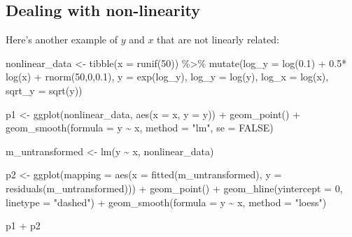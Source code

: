 \documentclass[
  letterpaper,
  8pt,
  a4paper]{book}
\newenvironment{Shaded}{\begin{snugshade}}{\end{snugshade}}
\newcommand{\AttributeTok}[1]{\textcolor[rgb]{0.40,0.45,0.13}{#1}}
\newcommand{\ConstantTok}[1]{\textcolor[rgb]{0.56,0.35,0.01}{#1}}
\newcommand{\DecValTok}[1]{\textcolor[rgb]{0.68,0.00,0.00}{#1}}
\newcommand{\FloatTok}[1]{\textcolor[rgb]{0.68,0.00,0.00}{#1}}
\newcommand{\FunctionTok}[1]{\textcolor[rgb]{0.28,0.35,0.67}{#1}}
\newcommand{\NormalTok}[1]{\textcolor[rgb]{0.00,0.23,0.31}{#1}}
\newcommand{\OtherTok}[1]{\textcolor[rgb]{0.00,0.23,0.31}{#1}}
\newcommand{\SpecialCharTok}[1]{\textcolor[rgb]{0.37,0.37,0.37}{#1}}
\newcommand{\StringTok}[1]{\textcolor[rgb]{0.13,0.47,0.30}{#1}}
\begin{document}
\subsection*{Dealing with
non-linearity}\label{dealing-with-non-linearity}

Here's another example of \(y\) and \(x\) that are not linearly related:

\begin{Shaded}
\begin{Highlighting}[]
\NormalTok{nonlinear\_data }\OtherTok{\textless{}{-}} \FunctionTok{tibble}\NormalTok{(}\AttributeTok{x =} \FunctionTok{runif}\NormalTok{(}\DecValTok{50}\NormalTok{)) }\SpecialCharTok{\%\textgreater{}\%}
  \FunctionTok{mutate}\NormalTok{(}\AttributeTok{log\_y =} \FunctionTok{log}\NormalTok{(}\FloatTok{0.1}\NormalTok{) }\SpecialCharTok{+} \FloatTok{0.5}\SpecialCharTok{*} \FunctionTok{log}\NormalTok{(x) }\SpecialCharTok{+} \FunctionTok{rnorm}\NormalTok{(}\DecValTok{50}\NormalTok{,}\DecValTok{0}\NormalTok{,}\FloatTok{0.1}\NormalTok{),}
         \AttributeTok{y =} \FunctionTok{exp}\NormalTok{(log\_y),}
         \AttributeTok{log\_y =} \FunctionTok{log}\NormalTok{(y),}
         \AttributeTok{log\_x =} \FunctionTok{log}\NormalTok{(x),}
         \AttributeTok{sqrt\_y =} \FunctionTok{sqrt}\NormalTok{(y))}

\NormalTok{p1 }\OtherTok{\textless{}{-}} \FunctionTok{ggplot}\NormalTok{(nonlinear\_data, }\FunctionTok{aes}\NormalTok{(}\AttributeTok{x =}\NormalTok{ x, }\AttributeTok{y =}\NormalTok{ y)) }\SpecialCharTok{+}
  \FunctionTok{geom\_point}\NormalTok{() }\SpecialCharTok{+} 
  \FunctionTok{geom\_smooth}\NormalTok{(}\AttributeTok{formula =}\NormalTok{ y }\SpecialCharTok{\textasciitilde{}}\NormalTok{ x, }\AttributeTok{method =} \StringTok{"lm"}\NormalTok{, }\AttributeTok{se =} \ConstantTok{FALSE}\NormalTok{)}

\NormalTok{m\_untransformed }\OtherTok{\textless{}{-}} \FunctionTok{lm}\NormalTok{(y }\SpecialCharTok{\textasciitilde{}}\NormalTok{ x, nonlinear\_data)}

\NormalTok{p2 }\OtherTok{\textless{}{-}} \FunctionTok{ggplot}\NormalTok{(}\AttributeTok{mapping =} \FunctionTok{aes}\NormalTok{(}\AttributeTok{x =} \FunctionTok{fitted}\NormalTok{(m\_untransformed), }\AttributeTok{y =} \FunctionTok{residuals}\NormalTok{(m\_untransformed))) }\SpecialCharTok{+}
  \FunctionTok{geom\_point}\NormalTok{() }\SpecialCharTok{+}
  \FunctionTok{geom\_hline}\NormalTok{(}\AttributeTok{yintercept =} \DecValTok{0}\NormalTok{, }\AttributeTok{linetype =} \StringTok{"dashed"}\NormalTok{) }\SpecialCharTok{+}
  \FunctionTok{geom\_smooth}\NormalTok{(}\AttributeTok{formula =}\NormalTok{ y }\SpecialCharTok{\textasciitilde{}}\NormalTok{ x, }\AttributeTok{method =} \StringTok{"loess"}\NormalTok{)}

\NormalTok{p1 }\SpecialCharTok{+}\NormalTok{ p2}
\end{Highlighting}
\end{Shaded}
\end{document}
